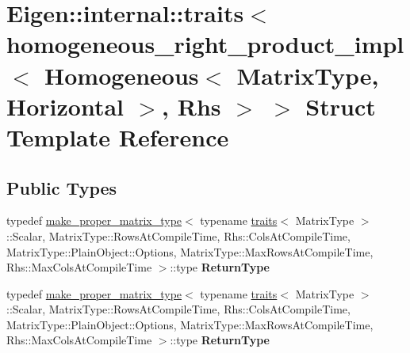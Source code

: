 \hypertarget{struct_eigen_1_1internal_1_1traits_3_01homogeneous__right__product__impl_3_01_homogeneous_3_01_mc10ae8b83e72e7ac1f6457e2d5f54a0a}{}\section{Eigen\+:\+:internal\+:\+:traits$<$ homogeneous\+\_\+right\+\_\+product\+\_\+impl$<$ Homogeneous$<$ Matrix\+Type, Horizontal $>$, Rhs $>$ $>$ Struct Template Reference}
\label{struct_eigen_1_1internal_1_1traits_3_01homogeneous__right__product__impl_3_01_homogeneous_3_01_mc10ae8b83e72e7ac1f6457e2d5f54a0a}
\subsection*{Public Types}
\begin{DoxyCompactItemize}
\item 
\mbox{\label{struct_eigen_1_1internal_1_1traits_3_01homogeneous__right__product__impl_3_01_homogeneous_3_01_mc10ae8b83e72e7ac1f6457e2d5f54a0a_a0ae985aecdcbfccc4e6a2b6aa60e6d7a}} 
typedef \hyperlink{class_eigen_1_1internal_1_1make__proper__matrix__type}{make\+\_\+proper\+\_\+matrix\+\_\+type}$<$ typename \hyperlink{struct_eigen_1_1internal_1_1traits}{traits}$<$ Matrix\+Type $>$\+::Scalar, Matrix\+Type\+::\+Rows\+At\+Compile\+Time, Rhs\+::\+Cols\+At\+Compile\+Time, Matrix\+Type\+::\+Plain\+Object\+::\+Options, Matrix\+Type\+::\+Max\+Rows\+At\+Compile\+Time, Rhs\+::\+Max\+Cols\+At\+Compile\+Time $>$\+::type {\bfseries Return\+Type}
\item 
\mbox{\label{struct_eigen_1_1internal_1_1traits_3_01homogeneous__right__product__impl_3_01_homogeneous_3_01_mc10ae8b83e72e7ac1f6457e2d5f54a0a_a0ae985aecdcbfccc4e6a2b6aa60e6d7a}} 
typedef \hyperlink{class_eigen_1_1internal_1_1make__proper__matrix__type}{make\+\_\+proper\+\_\+matrix\+\_\+type}$<$ typename \hyperlink{struct_eigen_1_1internal_1_1traits}{traits}$<$ Matrix\+Type $>$\+::Scalar, Matrix\+Type\+::\+Rows\+At\+Compile\+Time, Rhs\+::\+Cols\+At\+Compile\+Time, Matrix\+Type\+::\+Plain\+Object\+::\+Options, Matrix\+Type\+::\+Max\+Rows\+At\+Compile\+Time, Rhs\+::\+Max\+Cols\+At\+Compile\+Time $>$\+::type {\bfseries Return\+Type}
\end{DoxyCompactItemize}


